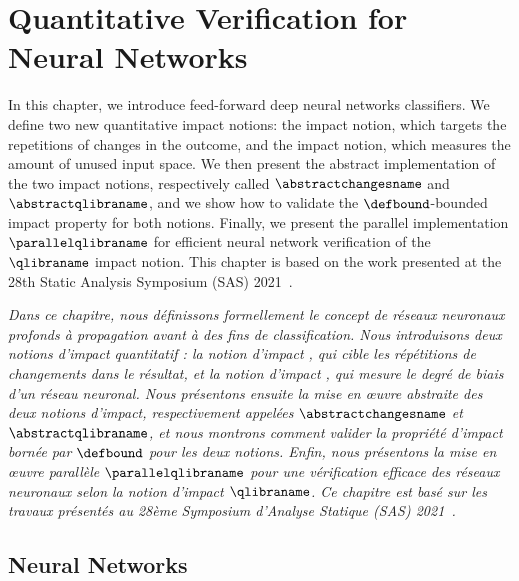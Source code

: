 \chapter{Quantitative Verification for Neural Networks}

In this chapter, we introduce feed-forward deep neural networks classifiers.
We define two new quantitative impact notions: the \changesname{} impact notion, which targets the repetitions of changes in the outcome, and the \qlibraname{} impact notion, which measures the amount of unused input space. We then present the abstract implementation of the two impact notions, respectively called $\abstractchangesname$ and $\abstractqlibraname$, and we show how to validate the $\defbound$-bounded impact property for both notions. Finally, we present the parallel implementation $\parallelqlibraname$ for efficient neural network verification of the $\qlibraname$ impact notion.
This chapter is based on the work presented at the 28th Static Analysis Symposium (SAS) 2021~\cite{Mazzucato2021}.

\emph{Dans ce chapitre, nous définissons formellement le concept de réseaux neuronaux profonds à propagation avant à des fins de classification.
Nous introduisons deux notions d'impact quantitatif : la notion d'impact \changesname{}, qui cible les répétitions de changements dans le résultat, et la notion d'impact \qlibraname{}, qui mesure le degré de biais d'un réseau neuronal. Nous présentons ensuite la mise en œuvre abstraite des deux notions d'impact, respectivement appelées $\abstractchangesname$ et $\abstractqlibraname$, et nous montrons comment valider la propriété d'impact bornée par $\defbound$ pour les deux notions. Enfin, nous présentons la mise en œuvre parallèle $\parallelqlibraname$ pour une vérification efficace des réseaux neuronaux selon la notion d'impact $\qlibraname$.
Ce chapitre est basé sur les travaux présentés au 28ème Symposium d'Analyse Statique (SAS) 2021~.}

% 
% 
% 
% 
% 

\section{Neural Networks}

